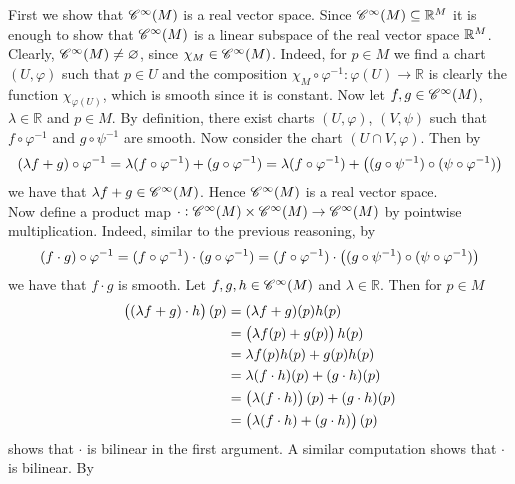 \begin{solution}
	First we show that $\mathscr{C}^\infty(M)$ is a real vector space. Since $\mathscr{C}^\infty(M) \subseteq \mathbb{R}^M$ it is enough to show that $\mathscr{C}^\infty(M)$ is a linear subspace of the real vector space $\mathbb{R}^M$. Clearly, $\mathscr{C}^\infty(M) \neq \varnothing$, since $\chi_M \in \mathscr{C}^\infty(M)$. Indeed, for $p \in M$ we find a chart $(U,\varphi)$ such that $p \in U$ and the composition $\chi_M \circ \varphi^{-1}: \varphi(U) \to \mathbb{R}$ is clearly the function $\chi_{\varphi(U)}$, which is smooth since it is constant. Now let $f,g \in \mathscr{C}^\infty(M)$, $\lambda \in \mathbb{R}$ and $p \in M$. By definition, there exist charts $(U,\varphi)$, $(V,\psi)$ such that $f \circ \varphi^{-1}$ and $g \circ \psi^{-1}$ are smooth. Now consider the chart $(U \cap V,\varphi)$. Then by
	\begin{equation*}
		(\lambda f + g) \circ \varphi^{-1} = \lambda (f \circ \varphi^{-1}) + (g \circ \varphi^{-1}) = \lambda (f \circ \varphi^{-1}) + \del[1]{(g \circ \psi^{-1}) \circ (\psi \circ \varphi^{-1})}
	\end{equation*}
	\noindent we have that $\lambda f + g \in \mathscr{C}^\infty(M)$. Hence $\mathscr{C}^\infty(M)$ is a real vector space.\\
	Now define a product map $\cdot:\mathscr{C}^\infty(M) \times \mathscr{C}^\infty(M) \to \mathscr{C}^\infty(M)$ by pointwise multiplication. Indeed, similar to the previous reasoning, by
	\begin{equation*}
		(f \cdot g) \circ \varphi^{-1} = (f \circ \varphi^{-1}) \cdot (g \circ \varphi^{-1}) = (f \circ \varphi^{-1}) \cdot \del[1]{(g \circ \psi^{-1}) \circ (\psi \circ \varphi^{-1})}
	\end{equation*}
	\noindent we have that $f \cdot g$ is smooth. Let $f,g,h \in \mathscr{C}^\infty(M)$ and $\lambda \in \mathbb{R}$. Then for $p \in M$
	\begin{align*}
		\del[1]{(\lambda f + g) \cdot h}(p) &= (\lambda f + g)(p) h(p)\\
		&= \del[1]{\lambda f(p) + g(p)} h(p)\\
		&= \lambda f(p) h(p) + g(p) h(p)\\
		&= \lambda (f\cdot h)(p) + (g \cdot h)(p)\\
		&= \del[1]{\lambda(f \cdot h)}(p) + (g \cdot h)(p)\\
		&= \del[1]{\lambda (f \cdot h) + (g \cdot h)}(p)
	\end{align*}
	\noindent shows that $\cdot$ is bilinear in the first argument. A similar computation shows that $\cdot$ is bilinear. By

\end{solution}
